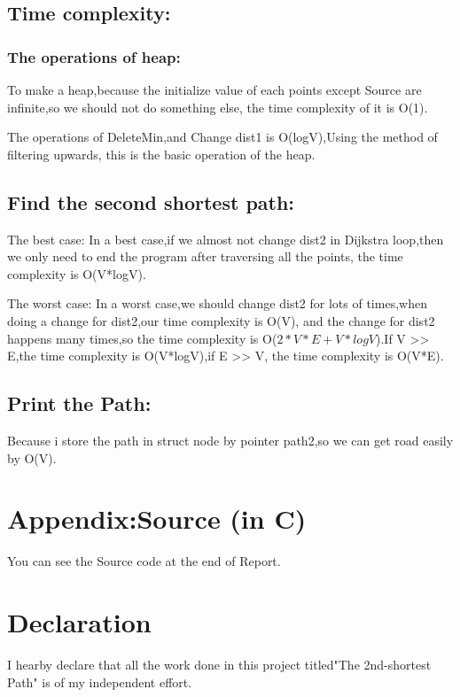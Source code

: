 \documentclass[12pt]{article}
\begin{document}
\subsection*{Time complexity:}

\subsubsection*{The operations of heap:}
To make a heap,because the initialize value of each points except Source are infinite,so we should not do something else,
the time complexity of it is O(1).

The operations of DeleteMin,and Change dist1 is O(logV),Using the method of filtering upwards, this is the basic operation of the heap.


\subsection*{Find the second shortest path:}
The best case: In a best case,if we almost not change dist2 in Dijkstra loop,then we only need to end the program after traversing all the points,
the time complexity is O(V*logV).

The worst case: In a worst case,we should change dist2 for lots of times,when doing a change for dist2,our time complexity is O(V),
and the change for dist2 happens many times,so the time complexity is O($2*V*E + V*logV $).If V >> E,the time complexity 
is O(V*logV),if E >> V, the time complexity is O(V*E).

\subsection*{Print the Path:}
Because i store the path in struct node by pointer path2,so we can get road easily by O(V).

\section*{Appendix:Source (in C)}

You can see the Source code at the end of Report.

\section*{Declaration}
    I hearby declare that all the work done in this project titled"The 2nd-shortest Path"
is of my independent effort.
\end{document}
